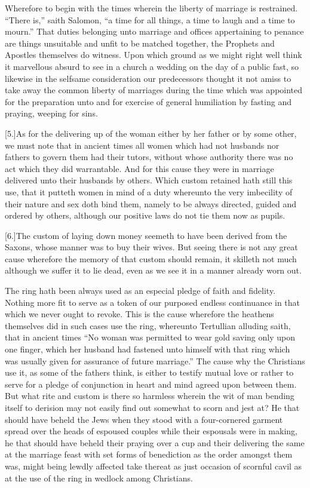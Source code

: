 Wherefore to begin with the times wherein the liberty of marriage is restrained. “There is,” saith Salomon, “a time for all things, a time to laugh and a time to mourn.” That duties belonging unto marriage and offices appertaining  to penance are things unsuitable and unfit to be matched together, the Prophets and Apostles themselves do witness.
 Upon which ground as we might right well think it marvellous absurd to see in a church a wedding on the day of a public fast, so likewise in the selfsame consideration our predecessors thought it not amiss to take away the common liberty of marriages during the time which was appointed for the preparation unto and for exercise of general humiliation by fasting and praying, weeping for sins.

[5.]As for the delivering up of the woman either by her father or by some other, we must note that in ancient times all women which had not husbands nor fathers to govern them had their tutors, without whose authority there was no act which they did warrantable. And for this cause they were in marriage delivered unto their husbands by others. Which custom retained hath still this use, that it putteth women in mind of a duty whereunto the very imbecility of their nature and sex doth bind them, namely to be always directed, guided and ordered by others, although our positive laws do not tie them now as pupils.

[6.]The custom of laying down money seemeth to have been derived from the Saxons, whose manner was to buy their  wives.
 But seeing there is not any great cause wherefore the memory of that custom should remain, it skilleth not much although we suffer it to lie dead, even as we see it in a manner already worn out.

The ring hath been always used as an especial pledge of faith and fidelity. Nothing more fit to serve as a token of our purposed endless continuance in that which we never ought to revoke. This is the cause wherefore the heathens themselves did in such cases use the ring, whereunto Tertullian alluding saith, that in ancient times “No woman was permitted to wear gold saving only upon one finger, which her husband had fastened unto himself with that ring which was usually given for assurance of future marriage.” The cause why the Christians use it, as some of the fathers think, is either to testify mutual love or rather to serve for a pledge of conjunction in heart and mind agreed upon between them. But what rite and custom is there so harmless wherein the wit of man bending itself to derision may not easily find out somewhat to scorn and jest at? He that should have beheld the Jews when they stood with a four-cornered garment  spread over the heads of espoused couples while their espousals were in making,
 he that should have beheld their praying over a cup and their delivering the same at the marriage feast with set forms of benediction as the order amongst them was, might being lewdly affected take thereat as just occasion of scornful cavil as at the use of the ring in wedlock among Christians.

